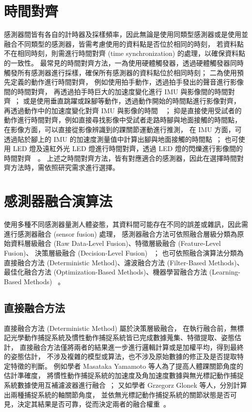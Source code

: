 \section{時間對齊}
感測器間皆有各自的計時器及採樣頻率，因此無論是使用同類型感測器或是使用並融合不同類型的感測器，皆需考慮使用的資料點是否位於相同的時刻，
若資料點不在相同時刻，則需進行時間對齊 (time synchronization) 的處理，以確保資料點的一致性。
最常見的時間對齊方法，一為使用硬體觸發器，透過硬體觸發器同時觸發所有感測器進行採樣，確保所有感測器的資料點位於相同時刻；
二為使用預先定義的動作進行時間對齊，
例如使用拍手動作，透過拍手發出的聲音進行影像間的時間對齊，
再透過拍手時巨大的加速度變化進行 IMU 與影像間的時間對齊~\cite{pons2012data}；
或是使用垂直跳躍或跺腳等動作，透過動作開始的時間點進行影像對齊，
再透過動作中的加速度變化對齊 IMU 與影像的時間~\cite{destelle2014low}~\cite{Trumble:BMVC:2017}；
抑是直接使用受試者的動作進行時間對齊，例如直接尋找影像中受試者走路時腳與地面接觸的時間點，
在影像方面，可以直接從影像辨識到的踝關節運動進行推測，
在 IMU 方面，可透過貼於腳上的 IMU 的加速度測量值中計算出腳與地面接觸的時間點~\cite{kaichi2020resolving}；
也可使用 LED 燈及遠紅外光 LED 燈進行時間對齊，透過 LED 燈的閃爍進行影像間的時間對齊~\cite{nakano2020evaluation}~\cite{needham2021accuracy}。
上述之時間對齊方法，皆有對應適合的感測器，因此在選擇時間對齊方法時，需依照研究需求進行選擇。

\section{感測器融合演算法}
使用多種不同感測器量測人體姿態，其資料間可能存在不同的誤差或雜訊，因此需進行感測器融合 (sensor fusion) 處理，
感測器融合方法可依照融合層級分類為原始資料層級融合 (Raw Data-Level Fusion)、特徵層級融合 (Feature-Level Fusion)、
決策層級融合 (Decision-Level Fusion) ~\cite{majumder2020vision}；
也可依照融合演算法分類為直接融合方法 (Deterministic Method)、濾波融合方法 (Filter-Based Methods)、
最佳化融合方法 (Optimization-Based Methods)、機器學習融合方法 (Learning-Based Methods) ~\cite{li2023visual}。


\subsection*{直接融合方法}
直接融合方法 (Deterministic Method) 屬於決策層級融合，
在執行融合前，無標記光學動作捕捉系統及慣性動作捕捉系統皆已完成數據蒐集、特徵提取、姿態估計，
直接融合方法僅將兩者的結果進一步進行邏輯計算或是加權平均，得到最終的姿態估計，
不涉及複雜的模型或算法，也不涉及原始數據的修正及是否提取特定特徵的判斷。
例如學者 Masataka Yamamoto 等人為了提高人體踝關節角度的估計準確度，
將慣性動作捕捉系統的加速度及角加速度數據與無光標記動作捕捉系統數據使用互補濾波器進行融合~\cite{yamamoto2022verification}；
又如學者 Grzegorz Glonek 等人，分別計算出兩種捕捉系統的軸關節角度，
並依無光標記動作捕捉系統的關節狀態是否可見，決定其結果是否可靠，從而決定兩者的融合權重~\cite{s17122857}。

